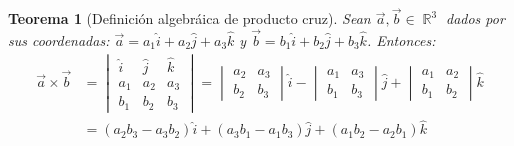 \documentclass[12pt, fleqn]{report}                             %
\newtheorem{Theorem}{Teorema}[section]                          %
\theoremstyle{break}                                            %
\DeclareMathOperator \Reals        {\mathbb{R}}                 %
\begin{document}
            \begin{Theorem}[Definición algebráica de producto cruz]
                Sean $\vec{a}, \vec{b} \in \Reals^3$ dados por sus coordenadas: $\vec{a}=a_1\hat{i} + a_2\hat{j} + a_3\hat{k}$ y $\vec{b}=b_1\hat{i} + b_2\hat{j} + b_3\hat{k}$. Entonces:
                \begin{align}
                    \vec{a} \times \vec{b} &=
                    \begin{vmatrix}
                        \hat{i} & \hat{j} & \hat{k}\\
                        a_1 & a_2 & a_3\\
                        b_1 & b_2 & b_3
                    \end{vmatrix}
                    = \begin{vmatrix}
                        a_2 & a_3\\
                        b_2 & b_3
                    \end{vmatrix}\hat{i} - 
                    \begin{vmatrix}
                        a_1 & a_3\\
                        b_1 & b_3
                    \end{vmatrix}\hat{j} + 
                    \begin{vmatrix}
                        a_1 & a_2\\
                        b_1 & b_2
                    \end{vmatrix}\hat{k}\\
                    &= (a_2b_3-a_3b_2)\hat{i} + (a_3b_1-a_1b_3)\hat{j} + (a_1b_2-a_2b_1)\hat{k}
                \end{align}
            \end{Theorem}
        
            
\end{document}
